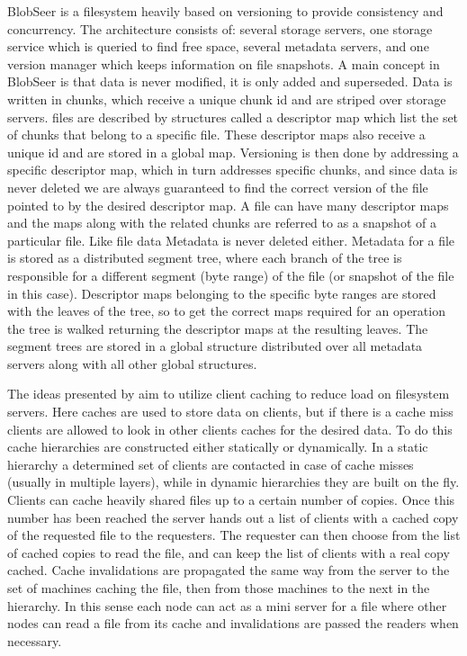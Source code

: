 BlobSeer \cite{Nicolae2011} is a filesystem heavily based on versioning to
provide consistency and concurrency. The architecture consists of: several
storage servers, one storage service which is queried to find free space,
several metadata servers, and one version manager which keeps information on
file snapshots. A main concept in BlobSeer is that data is never modified, it
is only added and superseded. Data is written in chunks, which receive a
unique chunk id and are striped over storage servers. files are described by
structures called a descriptor map which list the set of chunks that belong to
a specific file. These descriptor maps also receive a unique id and are stored
in a global map. Versioning is then done by addressing a specific descriptor
map, which in turn addresses specific chunks, and since data is never deleted
we are always guaranteed to find the correct version of the file pointed to by
the desired descriptor map. A file can have many descriptor maps and the maps
along with the related chunks are referred to as a snapshot of a particular
file. Like file data Metadata is never deleted either. Metadata for a file is
stored as a distributed segment tree, where each branch of the tree is
responsible for a different segment (byte range) of the file (or snapshot of
the file in this case). Descriptor maps belonging to the specific byte ranges
are stored with the leaves of the tree, so to get the correct maps required
for an operation the tree is walked returning the descriptor maps at the
resulting leaves. The segment trees are stored in a global structure
distributed over all metadata servers along with all other global structures.


The ideas presented by \cite{Blaze1992} aim to utilize client caching to
reduce load on filesystem servers. Here caches are used to store data on
clients, but if there is a cache miss clients are allowed to look in other
clients caches for the desired data. To do this cache hierarchies are
constructed either statically or dynamically. In a static hierarchy a
determined set of clients are contacted in case of cache misses (usually in
multiple layers), while in dynamic hierarchies they are built on the fly.
Clients can cache heavily shared files up to a certain number of copies. Once
this number has been reached the server hands out a list of clients with a
cached copy of the requested file to the requesters. The requester can then
choose from the list of cached copies to read the file, and can keep the list
of clients with a real copy cached.  Cache invalidations are propagated the
same way from the server to the set of machines caching the file, then from
those machines to the next in the hierarchy. In this sense each node can act
as a mini server for a file where other nodes can read a file from its cache
and invalidations are passed the readers when necessary.


